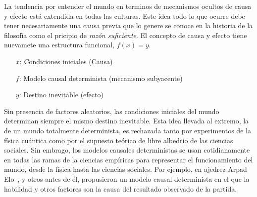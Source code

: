 \documentclass[a4paper,10pt]{book}
\begin{document}
La tendencia por entender el mundo en terminos de mecanismos ocultos de causa y efecto está extendida en todas las culturas.
%
Este idea todo lo que ocurre debe tener necesariamente una causa previa que lo genere se conoce en la historia de la filosofía como el pricipio de \emph{razón suficiente}.
%
El concepto de causa y efecto tiene nuevamete una estructura funcional, $f(x) = y$.
%
\begin{itemize}\setlength\itemsep{0cm}
 \item[$x$:] 
    {Condiciones iniciales (Causa)} 
 \item[$f$:] 
    {Modelo causal determinista (mecanismo subyacente)}
 \item[$y$:] 
    {Destino inevitable (efecto)}
\end{itemize}
%
Sin presencia de factores aleatorios, las condiciones iniciales del mundo determinan siempre el mismo destino inevitable.
%
Esta idea llevada al extremo, la de un mundo totalmente determinista, es rechazada tanto por experimentos de la física cuántica como por el supuesto teórico de libre albedrío de las ciencias sociales.
%
Sin embrago, los modelos causales deterministas se usan cotidianamente en todas las ramas de la ciencias empíricas para representar el funcionamiento del mundo, desde la física hasta las ciencias sociales.
%
Por ejemplo, en ajedrez Arpad Elo~\cite{ELO}, y otros antes de él, propusieron un modelo causal determinista en el que la habilidad y otros factores son la causa del resultado observado de la partida.
%
\end{document}
